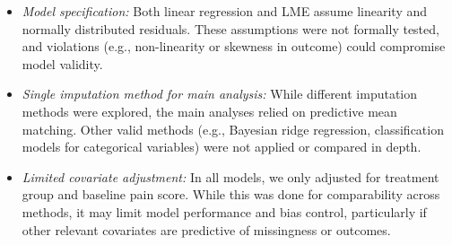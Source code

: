 \documentclass{article}
\begin{document}
\begin{itemize}
\item
  \emph{Model specification:} Both linear regression and LME assume
  linearity and normally distributed residuals. These assumptions were
  not formally tested, and violations (e.g., non-linearity or skewness
  in outcome) could compromise model validity.
\item
  \emph{Single imputation method for main analysis:} While different
  imputation methods were explored, the main analyses relied on
  predictive mean matching. Other valid methods (e.g., Bayesian ridge
  regression, classification models for categorical variables) were not
  applied or compared in depth.
\item
  \emph{Limited covariate adjustment:} In all models, we only adjusted
  for treatment group and baseline pain score. While this was done for
  comparability across methods, it may limit model performance and bias
  control, particularly if other relevant covariates are predictive of
  missingness or outcomes.
\end{itemize}



\end{document}
